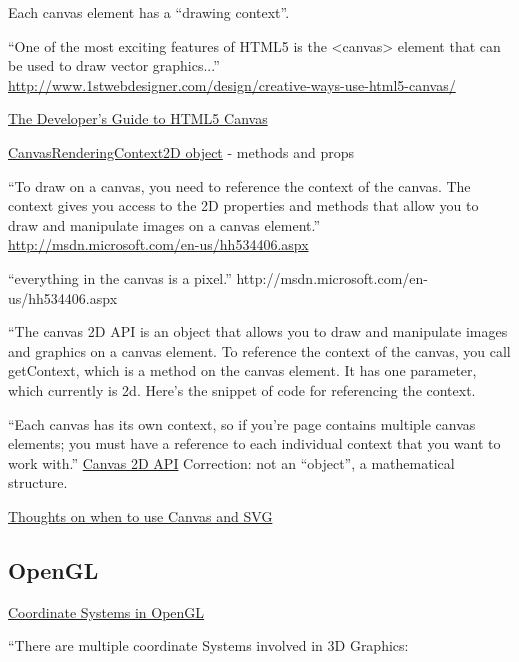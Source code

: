 \documentclass[12pt]{tufte-handout}
\numberwithin{equation}{subsection}
\numberwithin{equation}{subsection}
\begin{document}
\begin{appendices}
                Each canvas element has a ``drawing context''.

                ``One of the most exciting features of HTML5 is the <canvas> element that can be used to draw vector graphics...'' \url{http://www.1stwebdesigner.com/design/creative-ways-use-html5-canvas/}


                \href{http://msdn.microsoft.com/en-us/hh534406.aspx}{The Developer’s Guide to HTML5 Canvas}

                \href{http://msdn.microsoft.com/en-us/library/ff975057.aspx}{CanvasRenderingContext2D object} - methods and props

                ``To draw on a canvas, you need to reference the context of the canvas.  The context gives you access to the 2D properties and methods that allow you to draw and manipulate images on a canvas element.'' \url{http://msdn.microsoft.com/en-us/hh534406.aspx}

                ``everything in the canvas is a pixel.'' http://msdn.microsoft.com/en-us/hh534406.aspx

                ``The canvas 2D API is an object that allows you to draw and
                manipulate images and graphics on a canvas element.  To reference the context of the canvas, you call getContext, which is a method on the canvas element.  It has one parameter, which currently is 2d.  Here’s the snippet of code for referencing the context.

                ``Each canvas has its own context, so if you’re page contains multiple canvas elements; you must have a reference to each individual context that you want to work with.'' \url{Canvas 2D
                  API}  Correction: not an ``object'', a mathematical structure.

                \href{http://blogs.msdn.com/b/ie/archive/2011/04/22/thoughts-on-when-to-use-canvas-and-svg.aspx}{Thoughts on when to use Canvas and SVG}

                \subsection{OpenGL}
                \label{subs:opengl}


                \href{http://www.matrix44.net/cms/notes/opengl-3d-graphics/coordinate-systems-in-opengl}{Coordinate Systems in OpenGL}

                ``There are multiple coordinate Systems involved in 3D Graphics:


\end{appendices}
\end{document}
